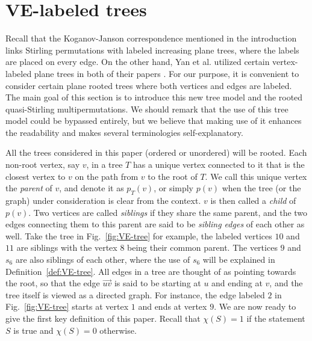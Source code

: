 \documentclass[11pt,reqno]{amsart}
\numberwithin{equation}{section}
\theoremstyle{plain}
\theoremstyle{definition}
\begin{document}
\section{VE-labeled trees}\label{sect:tree}

Recall that the Koganov-Janson correspondence mentioned in the introduction links Stirling permutations with labeled increasing plane trees, where the labels are placed on every edge. On the other hand, Yan et al. utilized certain vertex-labeled plane trees in both of their papers \cite{YYHZ,YZ}. For our purpose, it is convenient to consider certain plane rooted trees where both vertices and edges are labeled. The main goal of this section is to introduce this new tree model and the rooted quasi-Stirling multipermutations. We should remark that the use of this tree model could be bypassed entirely, but we believe that making use of it enhances the readability and makes several terminologies self-explanatory. 

All the trees considered in this paper (ordered or unordered) will be rooted. Each non-root vertex, say $v$, in a tree $T$ has a unique vertex connected to it that is the closest vertex to $v$ on the path from $v$ to the root of $T$. We call this unique vertex the {\em parent} of $v$, and denote it as $p_T(v)$, or simply $p(v)$ when the tree (or the graph) under consideration is clear from the context. $v$ is then called a {\em child} of $p(v)$. Two vertices are called {\em siblings} if they share the same parent, and the two edges connecting them to this parent are said to be {\em sibling edges} of each other as well. Take the tree in Fig.~\ref{fig:VE-tree} for example, the labeled vertices $10$ and $11$ are siblings with the vertex $8$ being their common parent. The vertices $9$ and $s_6$ are also siblings of each other, where the use of $s_6$ will be explained in Definition~\ref{def:VE-tree}. All edges in a tree are thought of as pointing towards the root, so that the edge $\overrightarrow{uv}$ is said to be starting at $u$ and ending at $v$, and the tree itself is viewed as a directed graph. For instance, the edge labeled $2$ in Fig.~\ref{fig:VE-tree} starts at vertex $1$ and ends at vertex $9$. We are now ready to give the first key definition of this paper. Recall that $\chi(S)=1$ if the statement $S$ is true and $\chi(S)=0$ otherwise.
\end{document}
